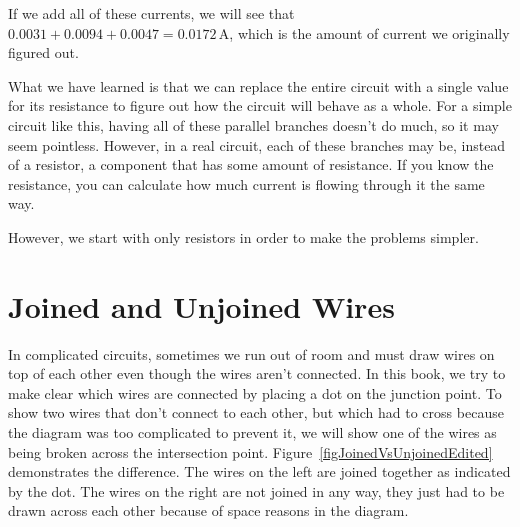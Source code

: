 If we add all of these currents, we will see that $0.0031 + 0.0094 + 0.0047 = 0.0172\,\si{\ampere}$, which is the amount of current we originally figured out.

What we have learned is that we can replace the entire circuit with a single value for its resistance to figure out how the circuit will behave as a whole.
For a simple circuit like this, having all of these parallel branches doesn't do much, so it may seem pointless.
However, in a real circuit, each of these branches may be, instead of a resistor, a component that has some amount of resistance.
If you know the resistance, you can calculate how much current is flowing through it the same way.

However, we start with only resistors in order to make the problems simpler.


\section{Joined and Unjoined Wires}

In complicated circuits, sometimes we run out of room and must draw wires on top of each other even though the wires aren't connected.
In this book, we try to make clear which wires are connected by placing a dot on the junction point.
To show two wires that don't connect to each other, but which had to cross because the diagram was too complicated to prevent it, we will show one of the wires as being broken across the intersection point.
Figure~\ref{figJoinedVsUnjoinedEdited} demonstrates the difference.
The wires on the left are joined together as indicated by the dot.
The wires on the right are not joined in any way, they just had to be drawn across each other because of space reasons in the diagram.


\reviewsection

